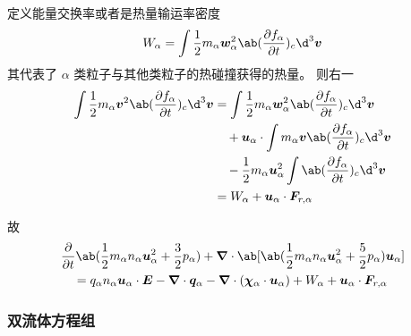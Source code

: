 定义能量交换率或者是热量输运率密度
\begin{equation}
W_\alpha = \int \frac{1}{2} m_\alpha \vec{w}_\alpha^2 \ab( \pdv{f_\alpha}{t} )_c \d^3 \vec{v}
\end{equation}
其代表了 $\alpha$ 类粒子与其他类粒子的热碰撞获得的热量。
则右一
\begin{equation}\begin{aligned}
\int \frac{1}{2} m_\alpha \vec{v}^2 \ab( \pdv{f_\alpha}{t} )_c \d^3 \vec{v}
&= \int \frac{1}{2} m_\alpha \vec{w}_\alpha^2 \ab( \pdv{f_\alpha}{t} )_c \d^3 \vec{v} \\
& \quad + \vec{u}_\alpha \cdot \int m_\alpha \vec{v} \ab( \pdv{f_\alpha}{t} )_c \d^3 \vec{v} \\
& \quad - \frac{1}{2} m_\alpha \vec{u}_\alpha^2 \int \ab( \pdv{f_\alpha}{t} )_c \d^3 \vec{v} \\
&= W_\alpha + \vec{u}_\alpha \cdot \vec{F}_{r,\alpha}
\end{aligned}\end{equation}

故
\begin{equation}\begin{aligned}\label{eq:Fluid_能量方程}
& \pdv{}{t} \ab(
    \frac{1}{2} m_\alpha n_\alpha \vec{u}_\alpha^2 + \frac{3}{2} p_\alpha
)
+ \dive{\ab[
    \ab(\frac{1}{2} m_\alpha n_\alpha \vec{u}_\alpha^2
    + \frac{5}{2} p_\alpha ) \vec{u}_\alpha
]} \\
& \quad = q_\alpha n_\alpha \vec{u}_\alpha \cdot \vec{E}
- \dive{\vec{q}_\alpha}
- \dive{(\vec{\chi}_\alpha \cdot \vec{u}_\alpha)}
+ W_\alpha + \vec{u}_\alpha \cdot \vec{F}_{r,\alpha}
\end{aligned}\end{equation}

\subsubsection{双流体方程组}

